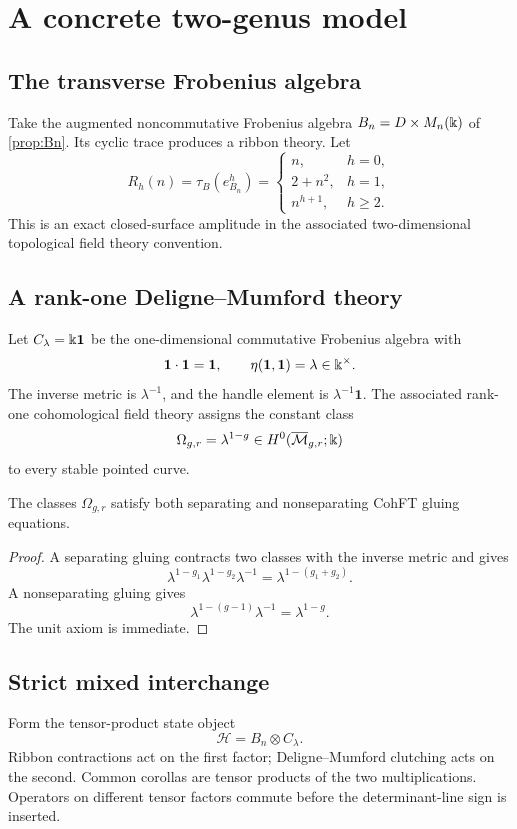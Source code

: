 \chapter{A concrete two-genus model}\label{chap:two-genus-example}

\section{The transverse Frobenius algebra}
Take the augmented noncommutative Frobenius algebra \(B_n=D\times M_n(\Bbbk)\) of \cref{prop:Bn}.  Its cyclic trace produces a ribbon theory.  Let
\[
 R_h(n)=\tau_B(e_{B_n}^{h})
 =\begin{cases}
 n,&h=0,\\
 2+n^2,&h=1,\\
 n^{h+1},&h\ge2.
 \end{cases}
\]
This is an exact closed-surface amplitude in the associated two-dimensional topological field theory convention.

\section{A rank-one Deligne--Mumford theory}
Let \(C_\lambda=\Bbbk\mathbf1\) be the one-dimensional commutative Frobenius algebra with
\[
 \mathbf1\cdot\mathbf1=\mathbf1,
 \qquad
 \eta(\mathbf1,\mathbf1)=\lambda\in\Bbbk^\times.
\]
The inverse metric is \(\lambda^{-1}\), and the handle element is \(\lambda^{-1}\mathbf1\).  The associated rank-one cohomological field theory assigns the constant class
\[
 \Omega_{g,r}=\lambda^{1-g}\in H^0(\overline{\mathcal M}_{g,r};\Bbbk)
\]
to every stable pointed curve.

\begin{proposition}[Clutching]\label{prop:rank-one-clutching}
The classes \(\Omega_{g,r}\) satisfy both separating and nonseparating CohFT gluing equations.
\end{proposition}
\begin{proof}
A separating gluing contracts two classes with the inverse metric and gives
\[
 \lambda^{1-g_1}\lambda^{1-g_2}\lambda^{-1}
 =\lambda^{1-(g_1+g_2)}.
\]
A nonseparating gluing gives
\[
 \lambda^{1-(g-1)}\lambda^{-1}=\lambda^{1-g}.
\]
The unit axiom is immediate.
\end{proof}

\section{Strict mixed interchange}
Form the tensor-product state object
\[
 \mathcal H=B_n\otimes C_\lambda.
\]
Ribbon contractions act on the first factor; Deligne--Mumford clutching acts on the second.  Common corollas are tensor products of the two multiplications.  Operators on different tensor factors commute before the determinant-line sign is inserted.

